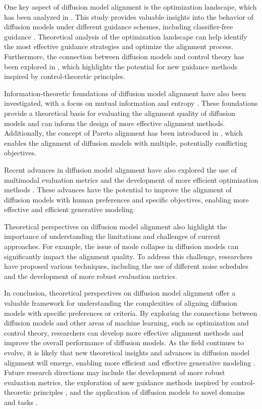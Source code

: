 \documentclass[11pt,a4paper]{article}
\begin{document}
One key aspect of diffusion model alignment is the optimization landscape, which has been analyzed in \cite{arxiv:2403.01639}. This study provides valuable insights into the behavior of diffusion models under different guidance schemes, including classifier-free guidance \cite{arxiv:2207.12598}. Theoretical analysis of the optimization landscape can help identify the most effective guidance strategies and optimize the alignment process. Furthermore, the connection between diffusion models and control theory has been explored in \cite{arxiv:2301.10677}, which highlights the potential for new guidance methods inspired by control-theoretic principles.

Information-theoretic foundations of diffusion model alignment have also been investigated, with a focus on mutual information and entropy \cite{doi:10.1109/tkde.2024.3361474}. These foundations provide a theoretical basis for evaluating the alignment quality of diffusion models and can inform the design of more effective alignment methods. Additionally, the concept of Pareto alignment has been introduced in \cite{arxiv:2402.02030}, which enables the alignment of diffusion models with multiple, potentially conflicting objectives.

Recent advances in diffusion model alignment have also explored the use of multimodal evaluation metrics \cite{arxiv:2409.05033} and the development of more efficient optimization methods \cite{arxiv:2402.16359}. These advances have the potential to improve the alignment of diffusion models with human preferences and specific objectives, enabling more effective and efficient generative modeling.

Theoretical perspectives on diffusion model alignment also highlight the importance of understanding the limitations and challenges of current approaches. For example, the issue of mode collapse in diffusion models can significantly impact the alignment quality. To address this challenge, researchers have proposed various techniques, including the use of different noise schedules \cite{arxiv:2502.12154} and the development of more robust evaluation metrics.

In conclusion, theoretical perspectives on diffusion model alignment offer a valuable framework for understanding the complexities of aligning diffusion models with specific preferences or criteria. By exploring the connections between diffusion models and other areas of machine learning, such as optimization and control theory, researchers can develop more effective alignment methods and improve the overall performance of diffusion models. As the field continues to evolve, it is likely that new theoretical insights and advances in diffusion model alignment will emerge, enabling more efficient and effective generative modeling \cite{arxiv:2502.06805}. Future research directions may include the development of more robust evaluation metrics, the exploration of new guidance methods inspired by control-theoretic principles \cite{arxiv:2301.10677}, and the application of diffusion models to novel domains and tasks \cite{doi:10.1145/3626235}.
\end{document}
